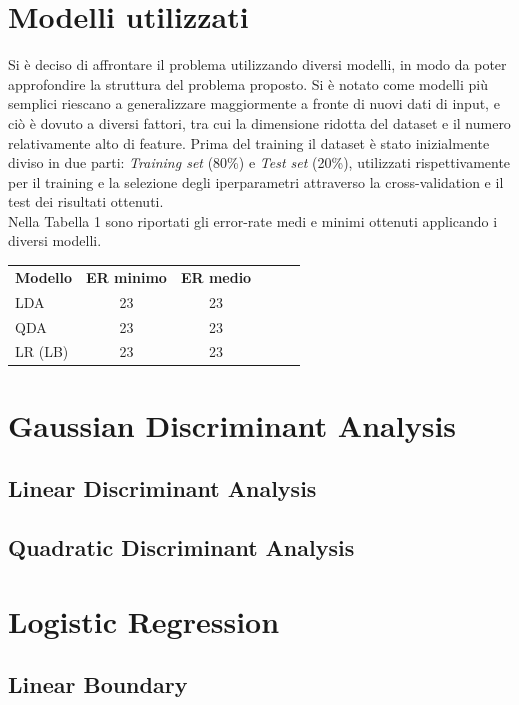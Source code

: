 \documentclass[a4paper,8pt]{article}
\begin{document}
\begin{multicols}{2}
\section{Modelli utilizzati}
Si è deciso di affrontare il problema utilizzando diversi modelli, in modo da poter approfondire la struttura del problema proposto. Si è notato come modelli più semplici riescano a generalizzare maggiormente a fronte di nuovi dati di input, e ciò è dovuto a diversi fattori, tra cui la dimensione ridotta del dataset e il numero relativamente alto di feature.
Prima del training il dataset è stato inizialmente diviso in due parti: \emph{Training set} (80\%) e \emph{Test set} (20\%), utilizzati rispettivamente per il training e la selezione degli iperparametri attraverso la cross-validation e il test dei risultati ottenuti.\\
Nella Tabella 1 sono riportati gli error-rate medi e minimi ottenuti applicando i diversi modelli.\\
\begin{center}
     \begin{tabular}{l|c|c|c|c|c}
       \textbf{Modello}                      & \textbf{ER minimo} & \textbf{ER medio} \\
	LDA          & 23                         & 23                        \\
	QDA       & 23                         & 23                        \\
	LR (LB) & 23                         & 23 			\\
      \end{tabular}
 \end{center}
 
\section{Gaussian Discriminant Analysis}
\subsection{Linear Discriminant Analysis}
\subsection{Quadratic Discriminant Analysis}
\section{Logistic Regression}
\subsection{Linear Boundary}

\end{multicols}
\end{document}

